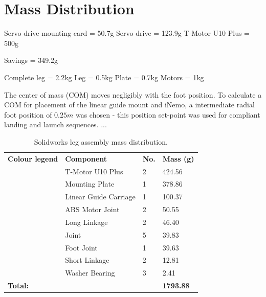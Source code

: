 \section{Mass Distribution}



Servo drive mounting card = 50.7g
Servo drive = 123.9g
T-Motor U10 Plus = 500g

Savings = 349.2g

Complete leg = 2.2kg
Leg = 0.5kg
Plate = 0.7kg
Motors = 1kg

The center of mass (COM) moves negligibly with the foot position. To calculate a COM for placement of the linear guide mount and iNemo, a intermediate radial foot position of $0.25 m$ was chosen - this position set-point was used for compliant landing and launch sequences. ...

\begin{table}[]
\centering
\begin{tabular}{llll}
\textbf{Colour legend}                          & \textbf{Component}    & \textbf{No.} & \textbf{Mass (g)} \\
\cellcolor[HTML]{FE0000}                        & T-Motor U10 Plus      & 2            & 424.56            \\
\cellcolor[HTML]{CB0000}                        & Mounting Plate        & 1            & 378.86            \\
\cellcolor[HTML]{010066}{\color[HTML]{000000} } & Linear Guide Carriage & 1            & 100.37            \\
\cellcolor[HTML]{3531FF}                        & ABS Motor Joint       & 2            & 50.55             \\
\cellcolor[HTML]{3531FF}                        & Long Linkage          & 2            & 46.40             \\
\cellcolor[HTML]{3531FF}                        & Joint                 & 5            & 39.83             \\
\cellcolor[HTML]{3531FF}                        & Foot Joint            & 1            & 39.63             \\
\cellcolor[HTML]{3531FF}                        & Short Linkage         & 2            & 12.81             \\
\cellcolor[HTML]{3531FF}                        & Washer Bearing        & 3            & 2.41              \\
\textbf{Total:}                                 & \textbf{}             & \textbf{}    & \textbf{1793.88} 
\end{tabular}
\caption{Solidworks leg assembly mass distribution.}
\label{my-label}
\end{table}

